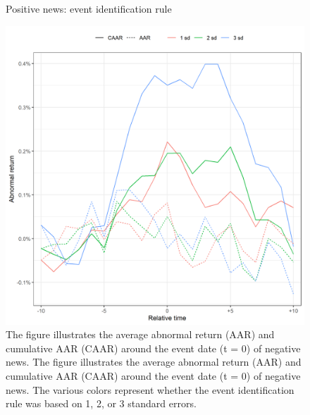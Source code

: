\begin{figure} [H]
    \centering
    \caption{Positive news: event identification rule}
    \includegraphics[scale=0.6]{Projekt/1.Figures analysis/ST_positive_sensitivity.png}
     \caption*{\footnotesize The figure illustrates the average abnormal return (AAR) and cumulative AAR (CAAR) around the event date (t = 0) of negative news. The figure illustrates the average abnormal return (AAR) and cumulative AAR (CAAR) around the event date (t = 0) of negative news. The various colors represent whether the event identification rule was based on 1, 2, or 3 standard errors. }
    \label{fig:ST_pos_sensi_sd}
\end{figure} 

